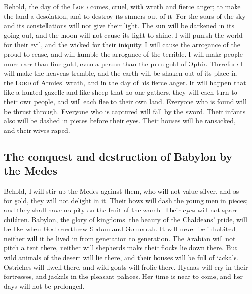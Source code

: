  Behold, the day of the \textsc{Lord} comes, cruel, with
wrath and fierce anger; to make the land a desolation, and to destroy
its sinners out of it.  For the stars of the sky and its
constellations will not give their light. The sun will be darkened in
its going out, and the moon will not cause its light to shine.
 I will punish the world for their evil, and the wicked
for their iniquity. I will cause the arrogance of the proud to cease,
and will humble the arrogance of the terrible.  I will
make people more rare than fine gold, even a person than the pure gold
of Ophir.  Therefore I will make the heavens tremble, and
the earth will be shaken out of its place in the \textsc{Lord} of
Armies' wrath, and in the day of his fierce anger.  It
will happen that like a hunted gazelle and like sheep that no one
gathers, they will each turn to their own people, and will each flee to
their own land.  Everyone who is found will be thrust
through. Everyone who is captured will fall by the sword.
 Their infants also will be dashed in pieces before their
eyes. Their houses will be ransacked, and their wives raped.

\hypertarget{the-conquest-and-destruction-of-babylon-by-the-medes}{%
\subsection{The conquest and destruction of Babylon by the
Medes}\label{the-conquest-and-destruction-of-babylon-by-the-medes}}

 Behold, I will stir up the Medes against them, who will
not value silver, and as for gold, they will not delight in it.
 Their bows will dash the young men in pieces; and they
shall have no pity on the fruit of the womb. Their eyes will not spare
children.  Babylon, the glory of kingdoms, the beauty of
the Chaldeans' pride, will be like when God overthrew Sodom and
Gomorrah.  It will never be inhabited, neither will it be
lived in from generation to generation. The Arabian will not pitch a
tent there, neither will shepherds make their flocks lie down there.
 But wild animals of the desert will lie there, and their
houses will be full of jackals. Ostriches will dwell there, and wild
goats will frolic there.  Hyenas will cry in their
fortresses, and jackals in the pleasant palaces. Her time is near to
come, and her days will not be prolonged.

